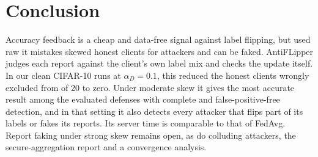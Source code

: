 \documentclass[conference]{IEEEtran}
\begin{document}
\section{Conclusion}
\label{sec:conclusion}
Accuracy feedback is a cheap and data-free signal against label flipping, but used raw it mistakes skewed honest clients for attackers and can be faked. AntiFLipper judges each report against the client's own label mix and checks the update itself. In our clean CIFAR-10 runs at $\alpha_D{=}0.1$, this reduced the honest clients wrongly excluded from \cleanHonRaw{} of 20 to zero. Under moderate skew it gives the most accurate result among the evaluated defenses with complete and false-positive-free detection, and in that setting it also detects every attacker that flips part of its labels or fakes its reports. Its server time is comparable to that of FedAvg. Report faking under strong skew remains open, as do colluding attackers, the secure-aggregation report and a convergence analysis.



\end{document}
